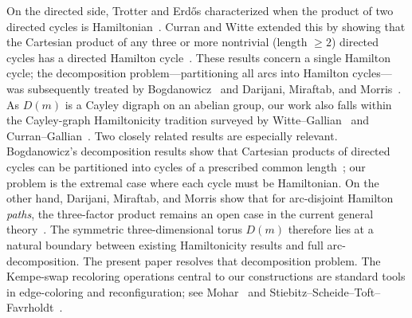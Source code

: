 \documentclass[11pt]{article}
\begin{document}
On the directed side, Trotter and Erd\H{o}s characterized when the product of two directed cycles is Hamiltonian~\cite{TrotterErdos1978}.
Curran and Witte extended this by showing that the Cartesian product of any three or more nontrivial (length $\ge 2$) directed cycles has a directed Hamilton cycle~\cite{CurranWitte1985}.
These results concern a single Hamilton cycle; the decomposition problem---partitioning all arcs into Hamilton cycles---was subsequently treated by Bogdanowicz~\cite{Bogdanowicz2017,Bogdanowicz2020} and Darijani, Miraftab, and Morris~\cite{DarijaniMiraftabMorris2022}.
As $D(m)$ is a Cayley digraph on an abelian group, our work also falls within the Cayley-graph Hamiltonicity tradition surveyed by Witte--Gallian~\cite{WitteGallian1984} and Curran--Gallian~\cite{CurranGallian1996}.
Two closely related results are especially relevant.
Bogdanowicz's decomposition results show that Cartesian products of directed cycles can be partitioned into cycles of a prescribed common length~\cite{Bogdanowicz2017}; our problem is the extremal case where each cycle must be Hamiltonian.
On the other hand, Darijani, Miraftab, and Morris show that for arc-disjoint Hamilton \emph{paths}, the three-factor product remains an open case in the current general theory~\cite{DarijaniMiraftabMorris2022}.
The symmetric three-dimensional torus $D(m)$ therefore lies at a natural boundary between existing Hamiltonicity results and full arc-decomposition.
The present paper resolves that decomposition problem.
The Kempe-swap recoloring operations central to our constructions are standard tools in edge-coloring and reconfiguration; see Mohar~\cite{Mohar2006} and Stiebitz--Scheide--Toft--Favrholdt~\cite{StiebitzEtAl2012}.
\end{document}
